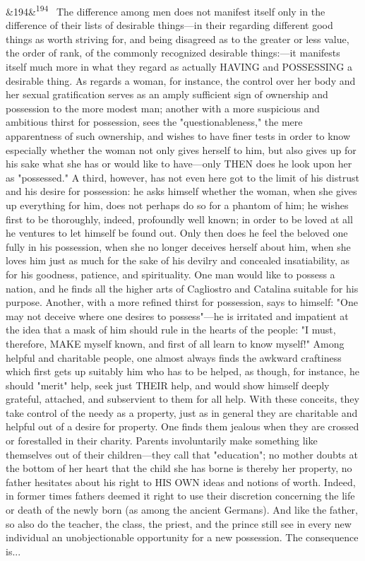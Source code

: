 \documentclass[12pt]{article}
\newcommand{\para}[1][]{\par\noindent\ifx&#1&\else\textsuperscript{\footnotesize #1}~\fi}
\begin{document}
\para[194] The difference among men does not manifest itself only in the difference of their lists of desirable things---in their regarding different good things as worth striving for, and being disagreed as to the greater or less value, the order of rank, of the commonly recognized desirable things:---it manifests itself much more in what they regard as actually HAVING and POSSESSING a desirable thing. As regards a woman, for instance, the control over her body and her sexual gratification serves as an amply sufficient sign of ownership and possession to the more modest man; another with a more suspicious and ambitious thirst for possession, sees the "questionableness," the mere apparentness of such ownership, and wishes to have finer tests in order to know especially whether the woman not only gives herself to him, but also gives up for his sake what she has or would like to have---only THEN does he look upon her as "possessed." A third, however, has not even here got to the limit of his distrust and his desire for possession: he asks himself whether the woman, when she gives up everything for him, does not perhaps do so for a phantom of him; he wishes first to be thoroughly, indeed, profoundly well known; in order to be loved at all he ventures to let himself be found out. Only then does he feel the beloved one fully in his possession, when she no longer deceives herself about him, when she loves him just as much for the sake of his devilry and concealed insatiability, as for his goodness, patience, and spirituality. One man would like to possess a nation, and he finds all the higher arts of Cagliostro and Catalina suitable for his purpose. Another, with a more refined thirst for possession, says to himself: "One may not deceive where one desires to possess"---he is irritated and impatient at the idea that a mask of him should rule in the hearts of the people: "I must, therefore, MAKE myself known, and first of all learn to know myself!" Among helpful and charitable people, one almost always finds the awkward craftiness which first gets up suitably him who has to be helped, as though, for instance, he should "merit" help, seek just THEIR help, and would show himself deeply grateful, attached, and subservient to them for all help. With these conceits, they take control of the needy as a property, just as in general they are charitable and helpful out of a desire for property. One finds them jealous when they are crossed or forestalled in their charity. Parents involuntarily make something like themselves out of their children---they call that "education"; no mother doubts at the bottom of her heart that the child she has borne is thereby her property, no father hesitates about his right to HIS OWN ideas and notions of worth. Indeed, in former times fathers deemed it right to use their discretion concerning the life or death of the newly born (as among the ancient Germans). And like the father, so also do the teacher, the class, the priest, and the prince still see in every new individual an unobjectionable opportunity for a new possession. The consequence is...
\end{document}
